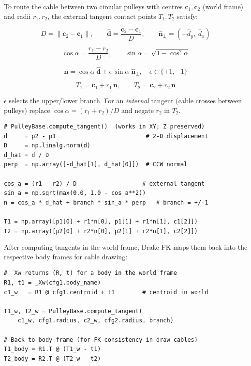 \documentclass[11pt, a4paper]{article}
\begin{document}
To route the cable between two circular pulleys with centres $\bm{c}_1,
\bm{c}_2$ (world frame) and radii $r_1, r_2$, the external tangent contact
points $T_1, T_2$ satisfy:

\begin{equation}
  D = \|\bm{c}_2 - \bm{c}_1\|, \qquad
  \hat{\bm{d}} = \frac{\bm{c}_2 - \bm{c}_1}{D},\qquad
  \hat{\bm{n}}_\perp = (-\hat{d}_y,\; \hat{d}_x)
\end{equation}

\begin{equation}
  \cos\alpha = \frac{r_1 - r_2}{D},\qquad
  \sin\alpha = \sqrt{1 - \cos^2\!\alpha}
\end{equation}

\begin{equation}
  \bm{n} = \cos\alpha\;\hat{\bm{d}} + \epsilon\,\sin\alpha\;\hat{\bm{n}}_\perp,
  \quad \epsilon \in \{+1,-1\}
\end{equation}

\begin{equation}
  T_1 = \bm{c}_1 + r_1\,\bm{n},\qquad
  T_2 = \bm{c}_2 + r_2\,\bm{n}
  \label{eq:tangent}
\end{equation}

$\epsilon$ selects the upper/lower branch.
For an \emph{internal} tangent (cable crosses between pulleys) replace
$\cos\alpha = (r_1+r_2)/D$ and negate $r_2$ in $T_2$.

\begin{lstlisting}
# PulleyBase.compute_tangent()  (works in XY; Z preserved)
d     = p2 - p1                          # 2-D displacement
D     = np.linalg.norm(d)
d_hat = d / D
perp  = np.array([-d_hat[1], d_hat[0]])  # CCW normal

cos_a = (r1 - r2) / D                   # external tangent
sin_a = np.sqrt(max(0.0, 1.0 - cos_a**2))
n = cos_a * d_hat + branch * sin_a * perp   # branch = +/-1

T1 = np.array([p1[0] + r1*n[0], p1[1] + r1*n[1], c1[2]])
T2 = np.array([p2[0] + r2*n[0], p2[1] + r2*n[1], c2[2]])
\end{lstlisting}

After computing tangents in the world frame, Drake FK maps them
back into the respective body frames for cable drawing:

\begin{lstlisting}
# _Xw returns (R, t) for a body in the world frame
R1, t1 = _Xw(cfg1.body_name)
c1_w   = R1 @ cfg1.centroid + t1        # centroid in world

T1_w, T2_w = PulleyBase.compute_tangent(
    c1_w, cfg1.radius, c2_w, cfg2.radius, branch)

# Back to body frame (for FK consistency in draw_cables)
T1_body = R1.T @ (T1_w - t1)
T2_body = R2.T @ (T2_w - t2)
\end{lstlisting}
\end{document}
